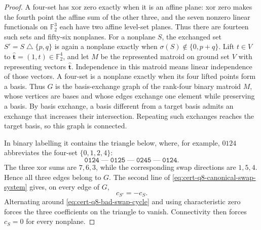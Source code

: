 \documentclass[11pt,letterpaper,onecolumn]{article}
\theoremstyle{plain}
\theoremstyle{definition}
\theoremstyle{remark}
\begin{document}
	\begin{proof}
		A four-set has xor zero exactly when it is an affine plane: xor zero makes
		the fourth point the affine sum of the other three, and the seven nonzero
		linear functionals on \(\mathbb F_2^3\) each have two affine level-set
		planes.  Thus there are fourteen such sets and fifty-six nonplanes.
		For a nonplane \(S\), the exchanged set \(S'=S\mathbin\triangle\{p,q\}\)
		is again a nonplane exactly when \(\sigma(S)\notin\{0,p+q\}\).
		Lift \(t\in V\) to
		\(\widehat{\mathbf t}=(1,t)\in\mathbb F_2^4\), and let \(M\) be the represented
		matroid on ground set \(V\) with representing vectors \(\widehat{\mathbf t}\). Independence in this matroid means linear independence of those vectors. A four-set is a nonplane exactly
		when its four lifted points form a basis.  Thus \(G\) is the
		basis-exchange graph of the rank-four binary matroid \(M\), whose
		vertices are bases and whose edges exchange one element while preserving
		a basis. By basis exchange, a basis different from a target basis admits an
        exchange that increases their intersection. Repeating such exchanges
        reaches the target basis, so this graph is connected.
		
		In binary labelling it contains the triangle below, where, for example,
		\(0124\) abbreviates the four-set \(\{0,1,2,4\}\):
		\begin{equation}
			\mathtt{0124}\;\text{---}\;\mathtt{0125}\;\text{---}\;
			\mathtt{0245}\;\text{---}\;\mathtt{0124}.
			\label{eq:cert-q8-bad-swap-cycle}
		\end{equation}
		The three xor sums are \(7,6,3\), while the corresponding swap directions
		are \(1,5,4\). Hence all three edges belong to \(G\).  The second
		line of \cref{eq:cert-q8-canonical-swap-system} gives, on every edge of \(G\),
		\begin{equation*}
			c_{S'}=-c_S.
		\end{equation*}
		Alternating around
		\cref{eq:cert-q8-bad-swap-cycle} and using characteristic zero forces the
		three coefficients on the triangle to vanish.  Connectivity then forces
		\(c_S=0\) for every nonplane.
		

\end{proof}
\end{document}
